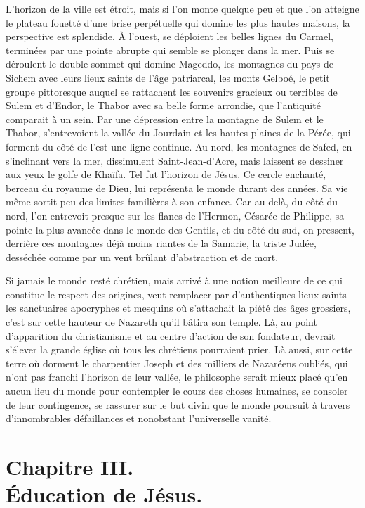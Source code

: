 \documentclass[french,twoside]{book} %
\newcommand\chapteropen{} %
\newcommand\chapterclose{} %
\begin{document}
L’horizon de la ville est étroit, mais si l’on monte quelque peu et que l’on atteigne le plateau fouetté d’une brise perpétuelle qui domine les plus hautes maisons, la perspective est splendide. À l’ouest, se déploient les belles lignes du Carmel, terminées par une pointe abrupte qui semble se plonger dans la mer. Puis se déroulent le double sommet qui domine Mageddo, les montagnes du pays de Sichem avec leurs lieux saints de l’âge patriarcal, les monts Gelboé, le petit groupe pittoresque auquel se rattachent les souvenirs gracieux ou terribles de Sulem et d’Endor, le Thabor avec sa belle forme arrondie, que l’antiquité comparait à un sein. Par une dépression entre la montagne de Sulem et le Thabor, s’entrevoient la vallée du Jourdain et les hautes plaines de la Pérée, qui forment du côté de l’est une ligne continue. Au nord, les montagnes de Safed, en s’inclinant vers la mer, dissimulent Saint-Jean-d’Acre, mais laissent se dessiner aux yeux le golfe de Khaïfa. Tel fut l’horizon de Jésus. Ce cercle enchanté, berceau du royaume de Dieu, lui représenta le monde durant des années. Sa vie même sortit peu des limites familières à son enfance. Car au-delà, du côté du nord, l’on entrevoit presque sur les flancs de l’Hermon, Césarée de Philippe, sa pointe la plus avancée dans le monde des Gentils, et du côté du sud, on pressent, derrière ces montagnes déjà moins riantes de la Samarie, la triste Judée, desséchée comme par un vent brûlant d’abstraction et de mort.\par
Si jamais le monde resté chrétien, mais arrivé à une notion meilleure de ce qui constitue le respect des origines, veut remplacer par d’authentiques lieux saints les sanctuaires apocryphes et mesquins où s’attachait la piété des âges grossiers, c’est sur cette hauteur de Nazareth qu’il bâtira son temple. Là, au point d’apparition du christianisme et au centre d’action de son fondateur, devrait s’élever la grande église où tous les chrétiens pourraient prier. Là aussi, sur cette terre où dorment le charpentier Joseph et des milliers de Nazaréens oubliés, qui n’ont pas franchi l’horizon de leur vallée, le philosophe serait mieux placé qu’en aucun lieu du monde pour contempler le cours des choses humaines, se consoler de leur contingence, se rassurer sur le but divin que le monde poursuit à travers d’innombrables défaillances et nonobstant l’universelle vanité.
\chapterclose


\chapteropen
\chapter[{Chapitre III. Éducation de Jésus.}]{Chapitre III.\\
Éducation de Jésus.}\renewcommand{\leftmark}{Chapitre III.\\
Éducation de Jésus.}
\end{document}

